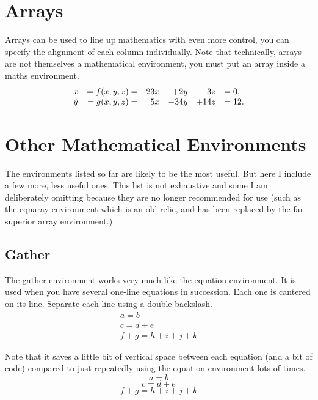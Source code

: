 \documentclass[a4paper,11pt]{article}
\begin{document}
\section{Arrays}

Arrays can be used to line up mathematics with even more control, you can specify the alignment of each column individually. Note that technically, arrays are not themselves a mathematical environment, you must put an array inside a maths environment.
\[
\begin{array}{l r r r r l}
	\dot{x} & = f(x,y,z) =  & 23x	& + 2y	& -3z 	& = 0,\\
	\dot{y} & = g(x,y,z) =  &  5x 	& -34y  & +14z 	& = 12.
\end{array}
\]

\pagebreak

%
%

\section{Other Mathematical Environments}

The environments listed so far are likely to be the most useful. But here I include a few more, less useful ones. This list is not exhaustive and some I am deliberately omitting because they are no longer recommended for use (such as the eqnaray environment which is an old relic, and has been replaced by the far superior array environment.)
 
\subsection{Gather}

The gather environment works very much like the equation environment. It is used when you have several one-line equations in succession. Each one is cantered on its line. Separate each line using a double backslash. 
\begin{gather}
a= b\\
c=d+e\\
f+g=h+i+j+k
\end{gather}

Note that it saves a little bit of vertical space between each equation (and a bit of code) compared to just repeatedly using the equation environment lots of times. 
\begin{equation}
a= b
\end{equation}
\begin{equation}
c=d+e
\end{equation}
\begin{equation}
f+g=h+i+j+k
\end{equation}
\end{document}
